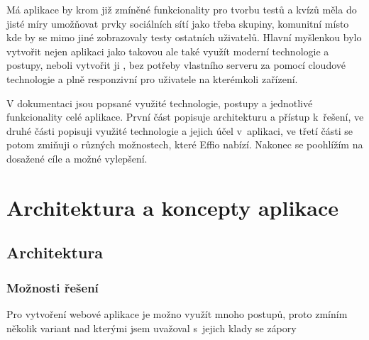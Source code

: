\documentclass[12pt, a4paper,
openright
]{report}
\begin{document}
Má aplikace by krom již zmíněné funkcionality pro tvorbu testů a kvízů měla do jisté míry umožňovat prvky sociálních sítí jako třeba skupiny, komunitní místo kde by se mimo jiné zobrazovaly testy ostatních uživatelů. Hlavní myšlenkou bylo vytvořit nejen aplikaci jako takovou ale také využít moderní technologie a postupy, neboli vytvořit ji , bez potřeby vlastního serveru za pomocí cloudové technologie  a plně responzivní pro uživatele na kterémkoli zařízení.

V dokumentaci jsou popsané využité technologie, postupy a jednotlivé funkcionality celé aplikace. První část popisuje architekturu a přístup k~řešení, ve druhé části popisuji využité technologie a jejich účel v~aplikaci, ve třetí části se potom zmiňuji o různých možnostech, které Effio nabízí. Nakonec se poohlížím na dosažené cíle a možné vylepšení.



\chapter{Architektura a koncepty aplikace}

\section{Architektura}

\subsection{Možnosti řešení}
Pro vytvoření webové aplikace je možno využít mnoho postupů, proto zmíním několik variant nad kterými jsem uvažoval s~jejich klady se zápory
\end{document}
